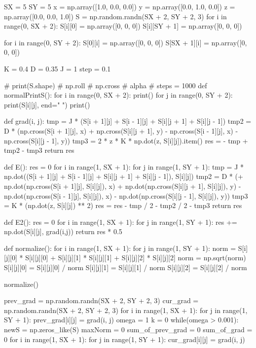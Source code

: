 \documentclass[ 12pt,x11names]{article}
\begin{document}
 \begin{python}

SX = 5
SY = 5
x = np.array([1.0, 0.0, 0.0])
y = np.array([0.0, 1.0, 0.0])
z = np.array([0.0, 0.0, 1.0])
S = np.random.randn(SX + 2, SY + 2, 3)
for i in range(0, SX + 2):
    S[i][0] = np.array([0, 0, 0])
    S[i][SY + 1] = np.array([0, 0, 0])

for i in range(0, SY + 2):
    S[0][i] = np.array([0, 0, 0])
    S[SX + 1][i] = np.array([0, 0, 0])

K = 0.4
D = 0.35
J = 1
step = 0.1

# print(S.shape)
# np.roll
# np.cross
# alpha
# steps = 1000
def normalPrintS():
    for i in range(0, SX + 2):
        print()
        for j in range(0, SY + 2):
            print(S[i][j], end=" ")
    print()


def grad(i, j):
    tmp = J * (S[i + 1][j] + S[i - 1][j] + S[i][j + 1] + S[i][j - 1])
    tmp2 = D * (np.cross(S[i + 1][j], x) + np.cross(S[i][j + 1], y) - np.cross(S[i - 1][j], x) - np.cross(S[i][j - 1], y))
    tmp3 = 2 * z * K * np.dot(z, S[i][j]).item()
    res = - tmp + tmp2 - tmp3
    return res


def E():
    res = 0
    for i in range(1, SX + 1):
        for j in range(1, SY + 1):
            tmp = J * np.dot((S[i + 1][j] + S[i - 1][j] + S[i][j + 1] + S[i][j - 1]), S[i][j])
            tmp2 = D * (+ np.dot(np.cross(S[i + 1][j], S[i][j]), x)
                        + np.dot(np.cross(S[i][j + 1], S[i][j]), y)
                        - np.dot(np.cross(S[i - 1][j], S[i][j]), x)
                        - np.dot(np.cross(S[i][j - 1], S[i][j]), y))
            tmp3 = K * (np.dot(z, S[i][j]) ** 2)
            res = res - tmp / 2 - tmp2 / 2 - tmp3
    return res

def E2():
    res = 0
    for i in range(1, SX + 1):
        for j in range(1, SY + 1):
            res += np.dot(S[i][j], grad(i,j))
    return res * 0.5

def normalize():
    for i in range(1, SX + 1):
        for j in range(1, SY + 1):
            norm = S[i][j][0] * S[i][j][0] + S[i][j][1] * S[i][j][1] + S[i][j][2] * S[i][j][2]
            norm = np.sqrt(norm)
            S[i][j][0] = S[i][j][0] / norm
            S[i][j][1] = S[i][j][1] / norm
            S[i][j][2] = S[i][j][2] / norm

normalize()

prev_grad =  np.random.randn(SX + 2, SY + 2, 3)
cur_grad = np.random.randn(SX + 2, SY + 2, 3)
for i in range(1, SX + 1):
    for j in range(1, SY + 1):
        prev_grad[i][j] = grad(i, j)
omega = 1
k = 0
while(omega > 0.001):
    newS = np.zeros_like(S)
    maxNorm = 0
    sum_of_prev_grad = 0
    sum_of_grad  =  0
    for i in range(1, SX + 1):
        for j in range(1, SY + 1):
            cur_grad[i][j] = grad(i,  j)


\end{python}
\end{document}
